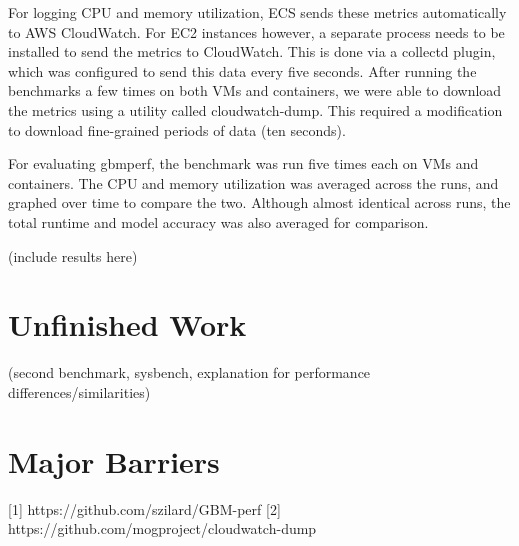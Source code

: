 \documentclass[11pt]{article}
\begin{document}
For logging CPU and memory utilization, ECS sends these metrics automatically to AWS CloudWatch. For EC2 instances however, a separate process needs to be installed to send the metrics to CloudWatch. This is done via a collectd plugin, which was configured to send this data every five seconds. After running the benchmarks a few times on both VMs and containers, we were able to download the metrics using a utility called cloudwatch-dump. This required a modification to download fine-grained periods of data (ten seconds).

For evaluating gbmperf, the benchmark was run five times each on VMs and containers. The CPU and memory utilization was averaged across the runs, and graphed over time to compare the two. Although almost identical across runs, the total runtime and model accuracy was also averaged for comparison.

(include results here)

\section{Unfinished Work}

(second benchmark, sysbench, explanation for performance differences/similarities)

\section{Major Barriers}


\hspace{16pt}

[1] https://github.com/szilard/GBM-perf
[2] https://github.com/mogproject/cloudwatch-dump
\end{document}
